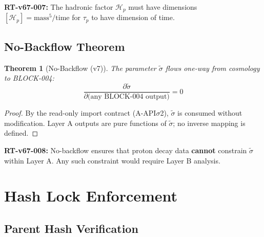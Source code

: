 \documentclass[11pt,letterpaper]{article}
\newtheorem{theorem}{Theorem}[section]
\newcommand{\st}{\tilde{\sigma}}
\newcommand{\Hp}{\mathcal{H}_p}
\begin{document}
\begin{reviewertrap}
\textbf{RT-v67-007:} The hadronic factor $\Hp$ must have dimensions $[\Hp] = \text{mass}^5 / \text{time}$ for $\tau_p$ to have dimension of time.
\end{reviewertrap}

\subsection{No-Backflow Theorem}
\label{subsec:no-backflow}

\begin{theorem}[No-Backflow (v7)]
\label{thm:no-backflow}
The parameter $\st$ flows one-way from cosmology to BLOCK-004:
\begin{equation}
\frac{\partial \st}{\partial \text{(any BLOCK-004 output)}} = 0
\label{eq:no-backflow}
\end{equation}
\end{theorem}

\begin{proof}
By the read-only import contract (A-API$\sigma$2), $\st$ is consumed without modification.
Layer A outputs are pure functions of $\st$; no inverse mapping is defined.
\end{proof}

\begin{reviewertrap}
\textbf{RT-v67-008:} No-backflow ensures that proton decay data \textbf{cannot} constrain $\st$ within Layer A. Any such constraint would require Layer B analysis.
\end{reviewertrap}

\section{Hash Lock Enforcement}
\label{sec:hash-enforcement}

\subsection{Parent Hash Verification}
\label{subsec:parent-hash}
\end{document}
